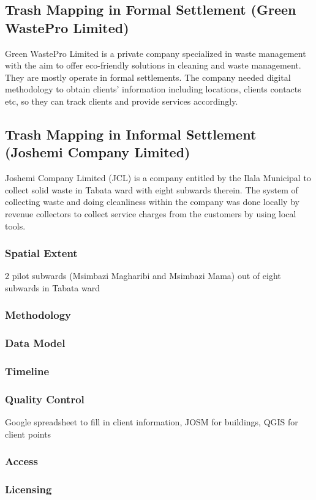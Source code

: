 \documentclass[a4paper,12pt,twoside]{article}
\begin{document}
\newpage
\subsection{Trash Mapping in Formal Settlement (Green WastePro Limited)}
Green WastePro Limited is a private company specialized in waste management with the aim to offer eco-friendly solutions in cleaning and waste management. They are mostly operate in formal settlements. The company needed digital methodology to obtain clients’ information including locations, clients contacts etc, so they can track clients and provide services accordingly.

\newpage
\subsection{Trash Mapping in Informal Settlement (Joshemi Company Limited)}

Joshemi Company Limited (JCL) is a company entitled by the Ilala Municipal to collect solid waste in Tabata ward with eight subwards therein. The system of collecting waste and doing cleanliness within the company was done locally by revenue collectors to collect service charges from the customers by using local tools.
\subsubsection {Spatial Extent}
2 pilot subwards (Msimbazi Magharibi and Msimbazi Mama) out of eight subwards in Tabata ward
\subsubsection{Methodology}
\subsubsection{Data Model}
\subsubsection{Timeline}
\subsubsection{Quality Control}
Google spreadsheet to fill in client information, JOSM for buildings, QGIS for client points
\subsubsection{Access}
\subsubsection{Licensing}
\end{document}
